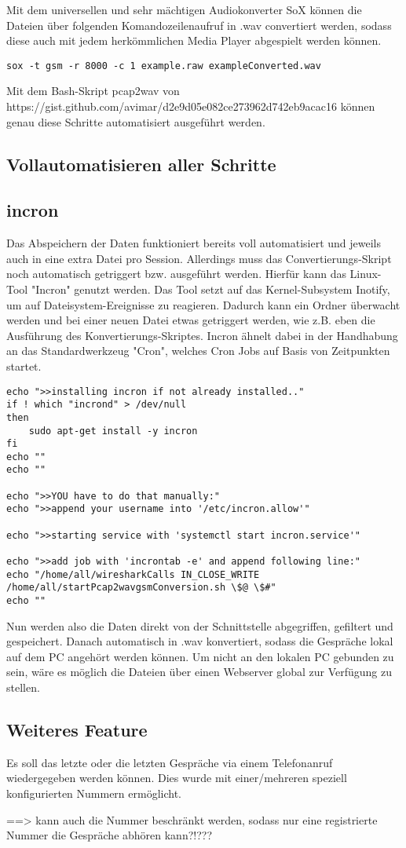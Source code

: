 Mit dem universellen und sehr mächtigen Audiokonverter SoX können die Dateien über folgenden Komandozeilenaufruf in .wav convertiert werden, sodass diese auch mit jedem herkömmlichen Media Player abgespielt werden können.
\begin{lstlisting}
sox -t gsm -r 8000 -c 1 example.raw exampleConverted.wav
\end{lstlisting}

Mit dem Bash-Skript pcap2wav von https://gist.github.com/avimar/d2e9d05e082ce273962d742eb9acac16 können genau diese Schritte automatisiert ausgeführt werden.


\subsection{Vollautomatisieren aller Schritte}
\subsection{incron}

Das Abspeichern der Daten funktioniert bereits voll automatisiert und jeweils auch in eine extra Datei pro Session. Allerdings muss das Convertierungs-Skript noch automatisch getriggert bzw. ausgeführt werden. Hierfür kann das Linux-Tool "Incron" genutzt werden. Das Tool setzt auf das Kernel-Subsystem Inotify, um auf Dateisystem-Ereignisse zu reagieren. Dadurch kann ein Ordner überwacht werden und bei einer neuen Datei etwas getriggert werden, wie z.B. eben die Ausführung des Konvertierungs-Skriptes. Incron ähnelt dabei in der Handhabung an das Standardwerkzeug "Cron", welches Cron Jobs auf Basis von Zeitpunkten startet.

\begin{lstlisting}
echo ">>installing incron if not already installed.."
if ! which "incrond" > /dev/null
then
	sudo apt-get install -y incron
fi
echo ""
echo ""

echo ">>YOU have to do that manually:"
echo ">>append your username into '/etc/incron.allow'"

echo ">>starting service with 'systemctl start incron.service'"

echo ">>add job with 'incrontab -e' and append following line:"
echo "/home/all/wiresharkCalls IN_CLOSE_WRITE /home/all/startPcap2wavgsmConversion.sh \$@ \$#"
echo ""
\end{lstlisting}

Nun werden also die Daten direkt von der Schnittstelle abgegriffen, gefiltert und gespeichert. Danach automatisch in .wav konvertiert, sodass die Gespräche lokal auf dem PC angehört werden können. Um nicht an den lokalen PC gebunden zu sein, wäre es möglich die Dateien über einen Webserver global zur Verfügung zu stellen.


\subsection{Weiteres Feature}
Es soll das letzte oder die letzten Gespräche via einem Telefonanruf wiedergegeben werden können. Dies wurde mit einer/mehreren speziell konfigurierten Nummern ermöglicht.

==> kann auch die Nummer beschränkt werden, sodass nur eine registrierte Nummer die Gespräche abhören kann?!???
